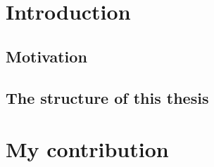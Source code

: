 \section{Introduction}


\subsection{Motivation}


\subsection{The structure of this thesis}


\section{My contribution}
